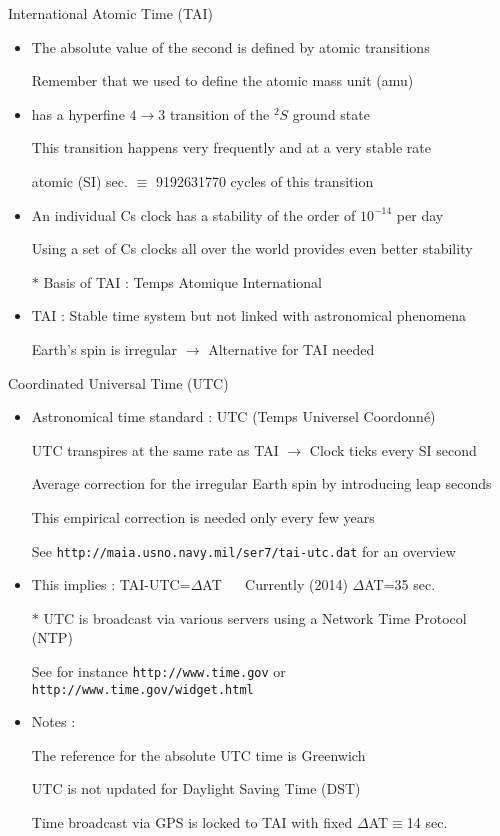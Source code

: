 \Tr
\begin{center}
{\red International Atomic Time (TAI)}
\end{center}
%
\begin{itemize}
\item The absolute value of the second is defined by atomic transitions
\item[] Remember that we used  to define the atomic mass unit (amu)
\item {} has a hyperfine $4 \rightarrow 3$ transition of the $^{2}S$ ground state
\item[] This transition happens very frequently and at a very stable rate
\item[] { atomic (SI) sec. $\equiv$ 9192631770 cycles of this  transition}
\item An individual Cs clock has a stability of the order of $10^{-14}$ per day
\item[] Using a set of Cs clocks all over the world provides even better stability 
\item[$\ast$] Basis of {\blue TAI : Temps Atomique International}
\item TAI : Stable time system but not linked with astronomical phenomena
\item[] Earth's spin is irregular $\rightarrow$ Alternative for TAI needed
\end{itemize}

\Tr
\begin{center}
{\red Coordinated Universal Time (UTC)}
\end{center}
%
\begin{itemize}
\item Astronomical time standard : {\blue UTC (Temps Universel Coordonn\'{e})}
\item[] UTC transpires at the same rate as TAI $\rightarrow$ Clock ticks every SI second
\item[] Average correction for the irregular Earth spin by introducing {\blue leap seconds}
\item[] This empirical correction is needed only every few years
\item[] See {\tt http://maia.usno.navy.mil/ser7/tai-utc.dat} for an overview
\item This implies : {\blue TAI-UTC=$\Delta$AT} $\quad$ Currently (2014) $\Delta$AT=35 sec. 
\item[$\ast$] UTC is broadcast via various servers using a Network Time Protocol (NTP)
\item[] See for instance {\tt http://www.time.gov} or {\tt http://www.time.gov/widget.html}
\item Notes :
\item[] {\blue The reference for the absolute UTC time is Greenwich}
\item[] UTC is not updated for Daylight Saving Time (DST)
\item[] Time broadcast via GPS is locked to TAI with fixed $\Delta$AT$\equiv$14 sec.
\end{itemize}

